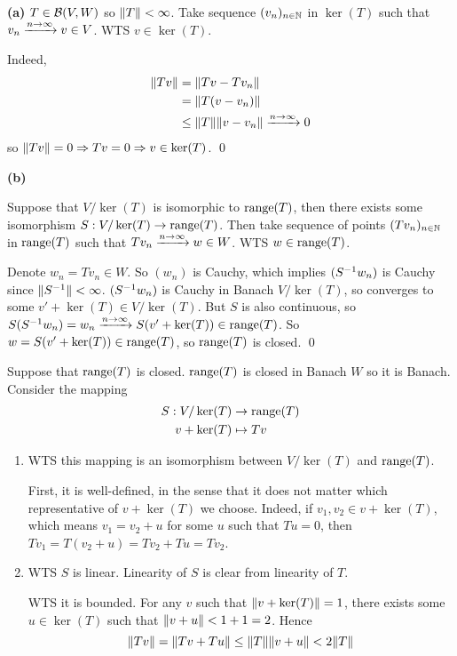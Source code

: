 \documentclass[a4paper, 10pt]{article}
\begin{document}
\begin{solution}
    \textbf{(a)} $T \in \mathcal{B}(V, W)$ so $\lVert T\rVert < \infty$. Take sequence $(v_n)_{n \in \mathbb{N}}$ in $\ker(T)$ such that $v_n \xrightarrow{n \to \infty} v \in V$. WTS $v \in \ker(T)$.

    Indeed, \begin{align*}
        \lVert Tv\rVert &=\lVert Tv - Tv_n\rVert \\
        &= \lVert T (v - v_n)\rVert \\
        &\leq \lVert T\rVert \lVert v - v_n\rVert \xrightarrow{n \to \infty} 0
    \end{align*}
    so $\lVert Tv\rVert = 0 \Rightarrow Tv = 0 \Rightarrow v \in \ker(T)$. \qed

    \textbf{(b)} 

    \pffwd Suppose that $V/\ker(T)$ is isomorphic to $\operatorname*{range}(T)$, then there exists some isomorphism $S: V/\ker(T) \to \operatorname*{range}(T)$. Then take sequence of points $(Tv_n)_{n \in \mathbb{N}}$ in $\operatorname*{range}(T)$ such that $Tv_n \xrightarrow{n \to \infty} w \in W$. WTS $w \in \operatorname*{range}(T)$.

    Denote $w_n = Tv_n \in W$. So $(w_n)$ is Cauchy, which implies $({S}^{-1}w_n)$ is Cauchy since $\lVert{S}^{-1}\rVert < \infty$. $({S}^{-1}w_n)$ is Cauchy in Banach $V /\ker(T)$, so converges to some $v' + \ker(T) \in V/\ker(T)$. But $S$ is also continuous, so $S({S}^{-1}w_n) = w_n \xrightarrow{n \to \infty} S(v' + \ker(T)) \in \operatorname*{range}(T)$. So $w = S(v' + \ker(T)) \in \operatorname*{range}(T)$, so $\operatorname*{range}(T)$ is closed. \qed

    \pfbwd Suppose that $\operatorname*{range}(T)$ is closed. $\operatorname*{range}(T)$ is closed in Banach $W$ so it is Banach. Consider the mapping \begin{align*}
    S : V / \ker(T) & \to \operatorname*{range}(T) \\
    v + \ker(T) &\mapsto Tv
    \end{align*}
    \begin{enumerate} [1.]
    
    \item WTS this mapping is an isomorphism between $V /\ker(T)$ and $\operatorname*{range}(T)$.

    First, it is well-defined, in the sense that it does not matter which representative of $v + \ker(T)$ we choose. Indeed, if $v_1, v_2 \in v + \ker(T)$, which means $v_1 = v_2 + u$ for some $u$ such that $Tu = 0$, then $Tv_1 = T(v_2 + u) = Tv_2 + Tu = Tv_2$.

    \item WTS $S$ is linear. Linearity of $S$ is clear from linearity of $T$.

    WTS it is bounded. For any $v$ such that $\lVert v + \ker(T)\rVert = 1$, there exists some $u \in \ker(T)$ such that $\lVert v + u\rVert < 1 + 1 = 2$. Hence
    \begin{equation*}
        \lVert Tv\rVert = \lVert Tv + Tu\rVert \leq \lVert T\rVert \lVert v + u\rVert  < 2 \lVert T\rVert
    \end{equation*}


\end{enumerate}
\end{solution}
\end{document}
